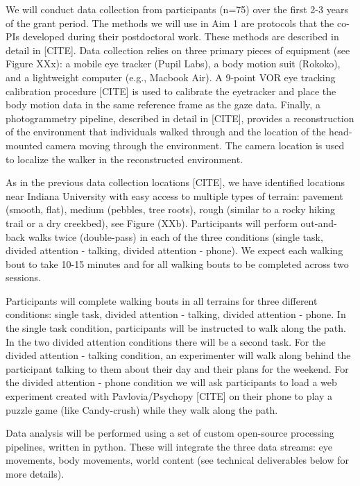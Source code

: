 \documentclass[
]{article}
\begin{document}
We will conduct data collection from participants (n=75) over the first
2-3 years of the grant period. The methods we will use in Aim 1 are
protocols that the co-PIs developed during their postdoctoral work.
These methods are described in detail in {[}CITE{]}. Data collection
relies on three primary pieces of equipment (see Figure XXx): a mobile
eye tracker (Pupil Labs), a body motion suit (Rokoko), and a lightweight
computer (e.g., Macbook Air). A 9-point VOR eye tracking calibration
procedure {[}CITE{]} is used to calibrate the eyetracker and place the
body motion data in the same reference frame as the gaze data. Finally,
a photogrammetry pipeline, described in detail in {[}CITE{]}, provides a
reconstruction of the environment that individuals walked through and
the location of the head-mounted camera moving through the environment.
The camera location is used to localize the walker in the reconstructed
environment.

As in the previous data collection locations {[}CITE{]}, we have
identified locations near Indiana University with easy access to
multiple types of terrain: pavement (smooth, flat), medium (pebbles,
tree roots), rough (similar to a rocky hiking trail or a dry creekbed),
see Figure (XXb). Participants will perform out-and-back walks twice
(double-pass) in each of the three conditions (single task, divided
attention - talking, divided attention - phone). We expect each walking
bout to take 10-15 minutes and for all walking bouts to be completed
across two sessions.

Participants will complete walking bouts in all terrains for three
different conditions: single task, divided attention - talking, divided
attention - phone. In the single task condition, participants will be
instructed to walk along the path. In the two divided attention
conditions there will be a second task. For the divided attention -
talking condition, an experimenter will walk along behind the
participant talking to them about their day and their plans for the
weekend. For the divided attention - phone condition we will ask
participants to load a web experiment created with Pavlovia/Psychopy
{[}CITE{]} on their phone to play a puzzle game (like Candy-crush) while
they walk along the path.

Data analysis will be performed using a set of custom open-source
processing pipelines, written in python. These will integrate the three
data streams: eye movements, body movements, world content (see
technical deliverables below for more details).
\end{document}
